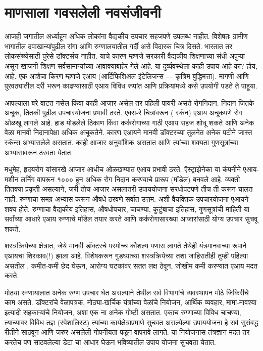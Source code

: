 \chapter{माणसाला गवसलेली नवसंजीवनी}

आजही जगातील अर्ध्याहून अधिक लोकांना वैद्यकीय उपचार सहजपणे उपलब्ध नाहीत. विशेषतः ग्रामीण भागातील दवाखान्यांपुढील रांगा आणि रुग्णालयातील गर्दी असे विदारक चित्र दिसते. भारतात तर लोकसंख्येसाठी पुरेसे डॉक्टर्सच नाहीत. याचे कारण म्हणजे सरकारी वैद्यकीय शिक्षणाच्या संधी अपुऱ्या असून खाजगी शिक्षण सर्वसामान्यांच्या आवाक्याबाहेर गेले आहे. या दुर्व्यवस्थेला काही उपाय आहे का? होय, आहे. एक आशेचा किरण म्हणजे एआय (आर्टिफिशिअल इंटेलिजन्स — कृत्रिम बुद्धिमत्ता). मागणी आणि पुरवठ्यातील दरी भरून काढण्यासाठी एआय विविध रूपांत आणि प्रक्रियांमध्ये कसे उपयोगी पडते ते पाहूया.

आपल्याला बरे वाटत नसेल किंवा काही आजार असेल तर पहिली पायरी असते रोगनिदान. निदान जितके अचूक, तितकी पुढील उपचारयोजना प्रभावी ठरते. एक्स-रे चित्रांवरून ( स्कॅन) एआय अचूकपणे रोग ओळखू लागले आहे. हाड मोडलेले ठिकाण किंवा कर्करोगाच्या गाठी एआय सहज शोधू शकते आणि अनेक वेळा मानवी निदानापेक्षा अधिक अचूकतेने. कारण एआयने मानवी डॉक्टरच्या तुलनेत अनेक पटीने जास्त स्कॅन्स अभ्यासलेले असतात. काही आजार अनुवांशिक असतात आणि त्यांच्या शक्यता गुणसूत्रांच्या अभ्यासावरून ठरवता येतात.

मधुमेह, हृदयरोग यांसारखे आजार आधीच ओळखण्यात एआय प्रभावी ठरते. ऍस्ट्राझेनेका या कंपनीने एआय-मशीन लर्निंग वापरून १००० हून अधिक रोग निदान करण्याचे प्रारूप (मॉडेल) बनवले आहे. व्यक्ती तितक्या प्रकृती असल्याने, जरी तोच आजार असलातरी उपाययोजना सरधोपटपणे तीच ती करून चालत नाही. रुग्णाचा समग्र अभ्यास करून औषधें ठरवणे सर्वात उत्तम. अशी वैयक्तिक उपचारयोजना एआयने शक्य होते. रुग्णाचा वैद्यकीय इतिहास, औषधोपचार, चाचण्या, कुटुंबाचा इतिहास, गुणसूत्रांची माहिती या सर्वांच्या आधारे एआय रुग्णाचे मॉडेल तयार करते आणि कर्करोगासारख्या आजारांसाठी योग्य उपचार सुचवू शकते.

शस्त्रक्रियेच्या क्षेत्रात, जेथे मानवी डॉक्टरचे परमोच्च कौशल्य पणास लागते तेथेही यंत्रमानवाच्या रूपाने एआयचा शिरकाव(!) झाला आहे. विशेषकरून गुडघ्याच्या शस्त्रक्रियेच्या तशा जाहिरातीही तुम्ही पहिल्या असतील . कमीत-कमी छेद घेऊन, आरोग्य घटकांवर सतत लक्ष ठेवून, जोखीम कमी करण्यात एआय मदत करते.

मोठ्या रुग्णायालात अनेक रुग्ण उपचार घेत असल्याने तेथील सर्व विभागांचे व्यवस्थापन मोठे जिकिरीचे काम असते. डॉक्टरांचे वेळापत्रक, मोठ्या-खर्चिक यंत्रांच्या वेळांचे नियोजन, आर्थिक व्यवहार, मामा-मावश्या इत्यादी सहकाऱ्यांचे नियोजन, अशा एक ना अनेक गोष्टी असतात. एकाच रुग्णाच्या विविध चाचण्या, त्याच्यावर विविध तज्ञ (स्पेशालिस्ट) त्यांच्या कार्यक्षेत्राप्रमाणे सुचवत असल्येल्या उपाययोजना हे सर्व सुसंबद्ध रीतीने साठवून आणि जरुर असलेली गोपनीयता पळून वापरावे लागते. या नियोजनास तंत्रज्ञान मदत तर करतेच पण साठवलेल्या डेटा चा आधार घेऊन भविष्यातील उपाय योजना सुचवता येतात.


